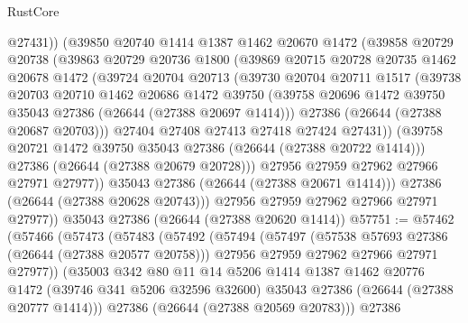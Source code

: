 \begin{lexlean}{RustCore}
\begin{coremodule}
              @27431))
          (@39850
            @20740
            @1414
            @1387
            @1462
            @20670
            @1472
            (@39858
              @20729
              @20738
              (@39863
                @20729
                @20736
                @1800
                (@39869
                  @20715
                  @20728
                  @20735
                  @1462
                  @20678
                  @1472
                  (@39724
                    @20704
                    @20713
                    (@39730
                      @20704
                      @20711
                      @1517
                      (@39738
                        @20703
                        @20710
                        @1462
                        @20686
                        @1472
                        @39750
                        (@39758 @20696 @1472 @39750 @35043 @27386 (@26644 (@27388 @20697 @1414)))
                        @27386
                        (@26644 (@27388 @20687 @20703)))
                      @27404
                      @27408
                      @27413
                      @27418
                      @27424
                      @27431))
                  (@39758 @20721 @1472 @39750 @35043 @27386 (@26644 (@27388 @20722 @1414)))
                  @27386
                  (@26644 (@27388 @20679 @20728)))
                @27956
                @27959
                @27962
                @27966
                @27971
                @27977))
            @35043
            @27386
            (@26644 (@27388 @20671 @1414)))
          @27386
          (@26644 (@27388 @20628 @20743)))
        @27956
        @27959
        @27962
        @27966
        @27971
        @27977))
    @35043
    @27386
    (@26644 (@27388 @20620 @1414))
@57751 := @57462
    (@57466
      (@57473
        (@57483
          (@57492
            (@57494
              (@57497
                (@57538 @57693 @27386 (@26644 (@27388 @20577 @20758)))
                @27956
                @27959
                @27962
                @27966
                @27971
                @27977))
            (@35003
              @342
              @80
              @11
              @14
              @5206
              @1414
              @1387
              @1462
              @20776
              @1472
              (@39746 @341 @5206 @32596 @32600)
              @35043
              @27386
              (@26644 (@27388 @20777 @1414)))
            @27386
            (@26644 (@27388 @20569 @20783)))
          @27386

\end{coremodule}
\end{lexlean}
